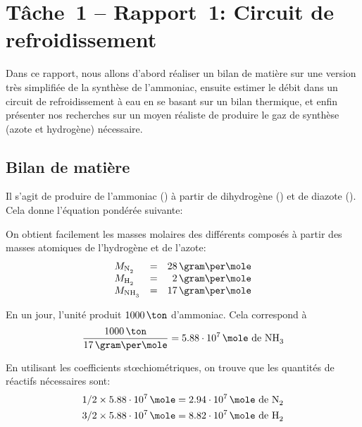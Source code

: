 \chapter{Tâche~1 -- Rapport~1: Circuit de refroidissement}

Dans ce rapport, nous allons d'abord réaliser un bilan de matière sur
une version très simplifiée de la synthèse de l'ammoniac,
ensuite estimer le débit dans un circuit de refroidissement à eau
en se basant sur un bilan thermique,
et enfin présenter nos recherches sur un moyen réaliste
de produire le gaz de synthèse
(azote et hydrogène) nécessaire.

\section{Bilan de matière}
\label{sec:matiere}

Il s'agit de produire de l'ammoniac () à partir de dihydrogène ()
et de diazote ().
Cela donne l'équation pondérée suivante:
\begin{center}
\end{center}

On obtient facilement les masses molaires des différents composés à partir
des masses atomiques de l'hydrogène et de l'azote:
\begin{equation*}
    \begin{array}{lcr}
        M_{\ce{N2}} &=& 28\,\gram\per\mole\\
        M_{\ce{H2}} &=& 2\,\gram\per\mole\\
        M_{\ce{NH3}} &=& 17\,\gram\per\mole\\
    \end{array}
\end{equation*}

En un jour, l'unité produit $1000\,\ton$ d'ammoniac.
Cela correspond à
\begin{equation}
    \label{eq:mole-nh3}
    \frac{1000\,\ton}{17\,\gram\per\mole} =
    5.88\cdot10^7\,\mole\mbox{ de \ce{NH3}}
\end{equation}

En utilisant les coefficients stœchiométriques, on trouve que les quantités de
réactifs nécessaires sont:
\begin{align*}
    1/2 \times 5.88\cdot10^7\,\mole &=
    2.94\cdot10^7\,\mole \mbox{ de \ce{N2}} \\
    3/2 \times 5.88\cdot10^7\,\mole &=
    8.82\cdot10^7\,\mole \mbox{ de \ce{H2}} \\
\end{align*}

